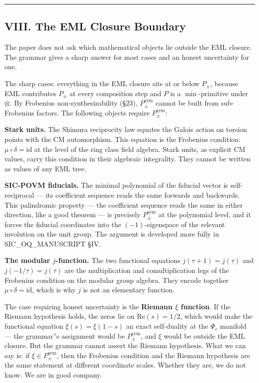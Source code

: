 \documentclass[12pt,a4paper]{article}
\newcommand{\pilcrow}{\S}
\begin{document}
\begin{center}
\rule{0.5\textwidth}{0.4pt}
\end{center}

\subsection{VIII. The EML Closure Boundary}

The paper does not ask which mathematical objects lie outside the EML closure.
The grammar gives a sharp answer for most cases and an honest uncertainty for one.

The sharp cases: everything in the EML closure sits at or below $P_{\pm}$, because
EML contributes $P_{\pm}$ at every composition step and $P$ is a $\min$-primitive
under $\otimes$. By Frobenius non-synthesizability (\pilcrow{}23), $P_{\pm}^{\text{sym}}$
cannot be built from sub-Frobenius factors. The following objects require
$P_{\pm}^{\text{sym}}$:

\textbf{Stark units.} The Shimura reciprocity law equates the Galois action on torsion
points with the CM automorphism. This equation is the Frobenius condition:
$\mu \circ \delta = \text{id}$ at the level of the ring class field algebra. Stark
units, as explicit CM values, carry this condition in their algebraic integrality.
They cannot be written as values of any EML tree.

\textbf{SIC-POVM fiducials.} The minimal polynomial of the fiducial vector is
self-reciprocal --- its coefficient sequence reads the same forwards and backwards.
This palindromic property --- the coefficient sequence reads the same in either
direction, like a good theorem --- is precisely $P_{\pm}^{\text{sym}}$ at the polynomial
level, and it forces the fiducial coordinates into the $(-1)$-eigenspace of the
relevant involution on the unit group. The argument is developed more fully in
SIC\_OQ\_MANUSCRIPT \pilcrow{}IV.

\textbf{The modular $j$-function.} The two functional equations $j(\tau+1) = j(\tau)$
and $j(-1/\tau) = j(\tau)$ are the multiplication and comultiplication legs of
the Frobenius condition on the modular group algebra. They encode together
$\mu \circ \delta = \text{id}$, which is why $j$ is not an elementary function.

The case requiring honest uncertainty is the \textbf{Riemann $\xi$ function}. If the
Riemann hypothesis holds, the zeros lie on $\text{Re}(s) = 1/2$, which would
make the functional equation $\xi(s) = \xi(1-s)$ an exact self-duality at the
$\Phi_c$ manifold --- the grammar''s assignment would be $P_{\pm}^{\text{sym}}$, and
$\xi$ would be outside the EML closure. But the grammar cannot assert the Riemann
hypothesis. What we can say is: if $\xi \in P_{\pm}^{\text{sym}}$, then the
Frobenius condition and the Riemann hypothesis are the same statement at different
coordinate scales. Whether they are, we do not know. We are in good company.
\end{document}
